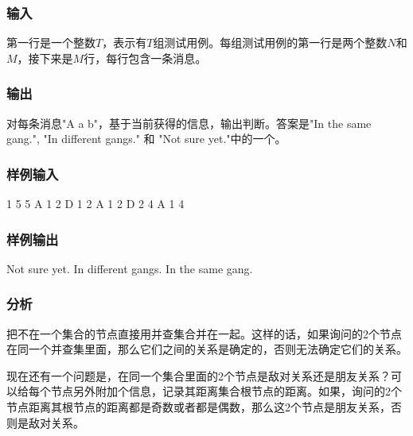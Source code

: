 \subsubsection{输入}
第一行是一个整数$T$，表示有$T$组测试用例。每组测试用例的第一行是两个整数$N$和$M$，接下来是$M$行，每行包含一条消息。

\subsubsection{输出}
对每条消息"A a b"，基于当前获得的信息，输出判断。答案是"In the same gang.", "In different gangs." 和 "Not sure yet."中的一个。

\subsubsection{样例输入}
\begin{Code}
1
5 5
A 1 2
D 1 2
A 1 2
D 2 4
A 1 4
\end{Code}

\subsubsection{样例输出}
\begin{Code}
Not sure yet.
In different gangs.
In the same gang.
\end{Code}

\subsubsection{分析}
把不在一个集合的节点直接用并查集合并在一起。这样的话，如果询问的2个节点在同一个并查集里面，那么它们之间的关系是确定的，否则无法确定它们的关系。

现在还有一个问题是，在同一个集合里面的2个节点是敌对关系还是朋友关系？可以给每个节点另外附加个信息，记录其距离集合根节点的距离。如果，询问的2个节点距离其根节点的距离都是奇数或者都是偶数，那么这2个节点是朋友关系，否则是敌对关系。

